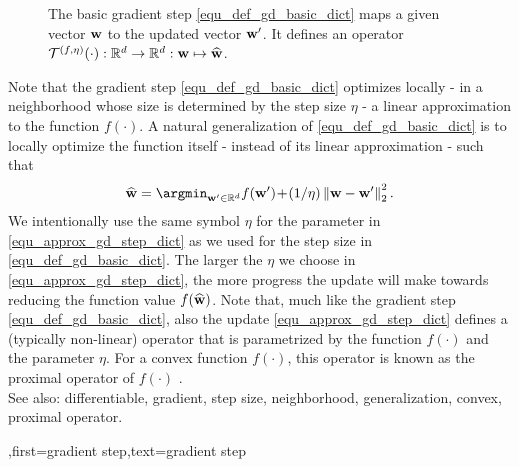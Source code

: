 {{\begin{figure}[H]
\begin{center}
			\end{center}
			\caption{The basic gradient step \eqref{equ_def_gd_basic_dict} maps a given vector ${\bf w}$ 
			to the updated vector ${\bf w}'$. It defines an operator 
			$\mathcal{T}^{(f,\eta)}(\cdot): \mathbb{R}^{d} \rightarrow \mathbb{R}^{d}:
			 {\bf w} \mapsto \widehat{{\bf w}}$.}
			\label{fig_basic_GD_step_single_dict}
		\end{figure}
		Note that the gradient step \eqref{equ_def_gd_basic_dict} optimizes locally - 
		in a neighborhood whose size is determined by the step size $\eta$ - a linear approximation 
		to the function $f(\cdot)$. A natural generalization of \eqref{equ_def_gd_basic_dict} is to locally 
		optimize the function itself - instead of its linear approximation - such that
		\begin{align} 
		\label{equ_approx_gd_step_dict}
		\widehat{{\bf w}} = \argmin_{{\bf w}' \in \mathbb{R}^{d}} f({\bf w}')\!+\!(1/\eta)\left\Vert  {{\bf w}-{\bf w}'} \right\Vert_{2}^2. 
		\end{align}
		We intentionally use the same symbol $\eta$ for the parameter in \eqref{equ_approx_gd_step_dict} 
		as we used for the step size in \eqref{equ_def_gd_basic_dict}. The larger the $\eta$ we choose in 
		\eqref{equ_approx_gd_step_dict}, the more progress the update will make towards reducing the 
		function value $f(\widehat{{\bf w}})$. Note that, much like the gradient step \eqref{equ_def_gd_basic_dict}, 
		also the update \eqref{equ_approx_gd_step_dict} defines a (typically non-linear) operator 
		that is parametrized by the function $f(\cdot)$ and the parameter $\eta$. For a convex function 
		$f(\cdot)$, this operator is known as the proximal operator of $f(\cdot)$ \cite{ProximalMethods}. 
					\\ 
		See also: differentiable, gradient, step size, neighborhood, generalization, convex, proximal operator.
		},first={gradient step},text={gradient step}}
	


